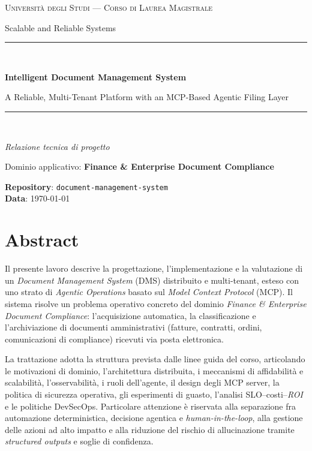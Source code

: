 \begin{titlepage}
    \centering
    \vspace*{1.5cm}
    {\scshape\Large Universit\`a degli Studi --- Corso di Laurea Magistrale\par}
    \vspace{0.4cm}
    {\large Scalable and Reliable Systems\par}
    \vspace{2.0cm}
    \rule{\linewidth}{0.4pt}\\[0.6cm]
    {\huge\bfseries Intelligent Document Management System\par}
    \vspace{0.3cm}
    {\Large A Reliable, Multi-Tenant Platform with an MCP-Based Agentic Filing Layer\par}
    \rule{\linewidth}{0.4pt}\\[1.2cm]

    {\large\itshape Relazione tecnica di progetto\par}
    \vspace{0.4cm}
    {\large Dominio applicativo: \textbf{Finance \& Enterprise Document Compliance}\par}
    \vfill
    \begin{flushleft}
        \textbf{Repository}: \texttt{document-management-system}\\[4pt]
        \textbf{Data}: \today
    \end{flushleft}
\end{titlepage}

\chapter*{Abstract}

\noindent
Il presente lavoro descrive la progettazione, l'implementazione e la valutazione
di un \emph{Document Management System} (DMS) distribuito e multi-tenant, esteso
con uno strato di \emph{Agentic Operations} basato sul \emph{Model Context Protocol}
(MCP). Il sistema risolve un problema operativo concreto del dominio
\emph{Finance \& Enterprise Document Compliance}: l'acquisizione automatica,
la classificazione e l'archiviazione di documenti amministrativi (fatture,
contratti, ordini, comunicazioni di compliance) ricevuti via posta elettronica.

La trattazione adotta la struttura prevista dalle linee guida del corso, articolando
le motivazioni di dominio, l'architettura distribuita, i meccanismi di affidabilit\`a
e scalabilit\`a, l'osservabilit\`a, i ruoli dell'agente, il design degli MCP server,
la politica di sicurezza operativa, gli esperimenti di guasto, l'analisi
SLO--costi--\emph{ROI} e le politiche DevSecOps. Particolare attenzione \`e
riservata alla separazione fra automazione deterministica, decisione agentica
e \emph{human-in-the-loop}, alla gestione delle azioni ad alto impatto e
alla riduzione del rischio di allucinazione tramite \emph{structured outputs}
e soglie di confidenza.

